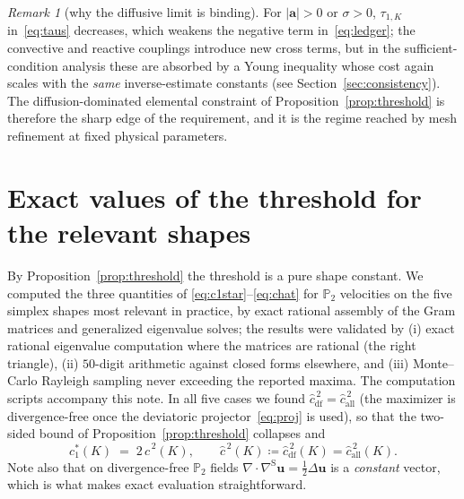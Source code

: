 \documentclass[11pt,a4paper]{article}
\theoremstyle{remark}
\newtheorem{remark}{Remark}
\newcommand{\PP}{\mathbb{P}}
\newcommand{\symgrad}{\nabla^{\mathrm{S}}}
\newcommand{\chat}{\hat{c}}
\begin{document}
\begin{remark}[why the diffusive limit is binding]
\label{rem:relax}
For $|\boldsymbol a| > 0$ or $\sigma > 0$, $\tau_{1,K}$
in~\eqref{eq:taus} decreases, which weakens the negative term
in~\eqref{eq:ledger}; the convective and reactive couplings introduce
new cross terms, but in the sufficient-condition analysis these are
absorbed by a Young inequality whose cost again scales with the
\emph{same} inverse-estimate constants (see
Section~\ref{sec:consistency}). The diffusion-dominated elemental
constraint of Proposition~\ref{prop:threshold} is therefore the sharp
edge of the requirement, and it is the regime reached by mesh
refinement at fixed physical parameters.
\end{remark}

\section{Exact values of the threshold for the relevant shapes}
\label{sec:values}

By Proposition~\ref{prop:threshold} the threshold is a pure shape
constant. We computed the three quantities of
\eqref{eq:c1star}--\eqref{eq:chat} for $\PP_2$ velocities on the five
simplex shapes most relevant in practice, by exact rational assembly
of the Gram matrices and generalized eigenvalue solves; the results
were validated by (i) exact rational eigenvalue computation where the
matrices are rational (the right triangle), (ii) $50$-digit
arithmetic against closed forms elsewhere, and (iii) Monte--Carlo
Rayleigh sampling never exceeding the reported maxima. The
computation scripts accompany this note. In all five cases we found
$\chat^{\,2}_{\mathrm{df}} = \chat^{\,2}_{\mathrm{all}}$ (the
maximizer is divergence-free once the deviatoric
projector~\eqref{eq:proj} is used), so that the two-sided bound of
Proposition~\ref{prop:threshold} collapses and
%
\begin{equation}
\label{eq:collapse}
c_1^*(K) \;=\; 2\,\chat^{\,2}(K),
\qquad
\chat^{\,2}(K) \coloneqq \chat^{\,2}_{\mathrm{df}}(K)
             = \chat^{\,2}_{\mathrm{all}}(K).
\end{equation}
%
Note also that on divergence-free $\PP_2$ fields
$\nabla\!\cdot\symgrad\boldsymbol u = \tfrac12\Delta\boldsymbol u$ is a
\emph{constant} vector, which is what makes exact evaluation
straightforward.
\end{document}
